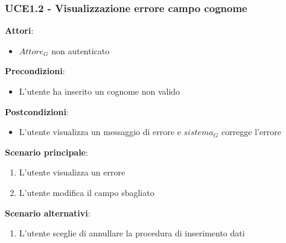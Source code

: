 \subsubsection{UCE1.2 - Visualizzazione errore campo cognome}
\textbf{Attori}:
\begin{itemize}
    \item $\textit{Attore}_G$ non autenticato
\end{itemize}
\textbf{Precondizioni}:
\begin{itemize}
    \item L'utente ha inserito un cognome non valido
\end{itemize}
\textbf{Postcondizioni}:
\begin{itemize}
    \item L'utente visualizza un messaggio di errore e $\textit{sistema}_G$ corregge l'errore
\end{itemize}
\textbf{Scenario principale}:
\begin{enumerate}
    \item L'utente visualizza un errore 
    \item L'utente modifica il campo sbagliato
\end{enumerate}
\textbf{Scenario alternativi}:
\begin{enumerate}
    \item L'utente sceglie di annullare la procedura di inserimento dati
\end{enumerate}